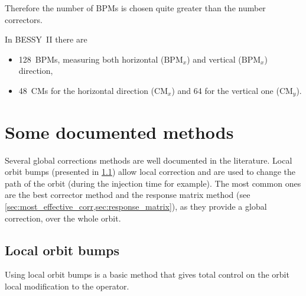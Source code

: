 Therefore the number of BPMs is chosen quite greater than the number correctors.

In BESSY~II there are
\begin{itemize}
	\item 128~BPMs, measuring both horizontal ($\text{BPM}_x$) and vertical ($\text{BPM}_x$) direction,
	\item 48~CMs for the horizontal direction ($\text{CM}_x$) and 64 for the vertical one ($\text{CM}_y$).
\end{itemize}

\section{Some documented methods}
Several global corrections methods are well documented in the literature. Local orbit bumps (presented in \cref{sec:orbit_bump}) allow local correction and are used to change the path of the orbit (during the injection time for example). The most common ones are the best corrector method and the response matrix method (see \cref{sec:most_effective_corr,sec:response_matrix}), as they provide a global correction, over the whole orbit.

\subsection{Local orbit bumps}
\label{sec:orbit_bump}
Using local orbit bumps is a basic method that gives total control on the orbit local modification to the operator.

